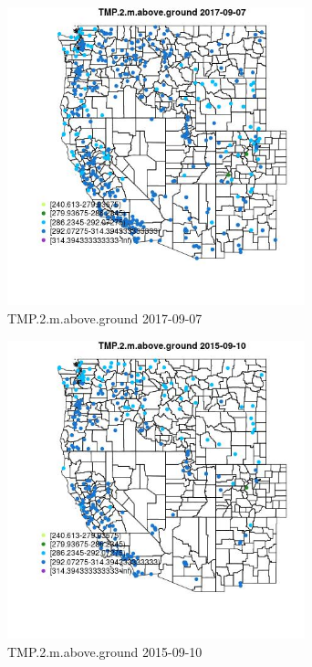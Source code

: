 \begin{figure} 
\centering  
\includegraphics[width=0.77\textwidth]{Code_Outputs/Report_ML_input_PM25_Step4_part_e_de_duplicated_aves_compiled_2019-05-20wNAs_MapObsTMP2maboveground2017-09-07.jpg} 
\caption{\label{fig:Report_ML_input_PM25_Step4_part_e_de_duplicated_aves_compiled_2019-05-20wNAsMapObsTMP2maboveground2017-09-07}TMP.2.m.above.ground 2017-09-07} 
\end{figure} 
 

\begin{figure} 
\centering  
\includegraphics[width=0.77\textwidth]{Code_Outputs/Report_ML_input_PM25_Step4_part_e_de_duplicated_aves_compiled_2019-05-20wNAs_MapObsTMP2maboveground2015-09-10.jpg} 
\caption{\label{fig:Report_ML_input_PM25_Step4_part_e_de_duplicated_aves_compiled_2019-05-20wNAsMapObsTMP2maboveground2015-09-10}TMP.2.m.above.ground 2015-09-10} 
\end{figure} 
 

